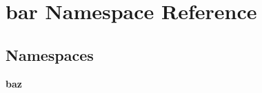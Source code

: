 \section{bar Namespace Reference}
\label{namespacebar}
\subsection*{Namespaces}
\begin{DoxyCompactItemize}
\item 
 {\bf baz}
\end{DoxyCompactItemize}
